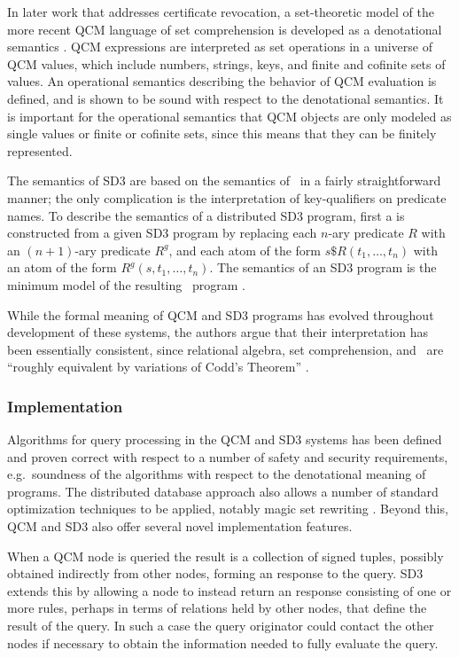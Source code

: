 In later work that addresses certificate revocation, a set-theoretic
model of the more recent QCM language of set comprehension is
developed as a denotational semantics \cite{Gunter:GCR}.  QCM
expressions are interpreted as set operations in a universe of QCM
values, which include numbers, strings, keys, and finite and cofinite
sets of values.  An operational semantics describing the behavior of
QCM evaluation is defined, and is shown to be sound with respect to
the denotational semantics.  It is important for the operational
semantics that QCM objects are only modeled as single values or finite
or cofinite sets, since this means that they can be finitely
represented.

The semantics of SD3 are based on the semantics of \datalog\ in a
fairly straightforward manner; the only complication is the
interpretation of key-qualifiers on predicate names.  To describe the
semantics of a distributed SD3 program, first a  is constructed from a given SD3 program by
replacing each $n$-ary predicate $R$ with an $(n+1)$-ary predicate
$R^g$, and each atom of the form $s\$R(t_1, \ldots, t_n)$ with an atom
of the form $R^g(s, t_1, \ldots, t_n)$. The semantics of an SD3
program is the minimum model of the resulting \datalog\ program
\cite{Jim:DDQE}.

While the formal meaning of QCM and SD3 programs has evolved
throughout development of these systems, the authors argue that their
interpretation has been essentially consistent, since relational
algebra, set comprehension, and \datalog\ are ``roughly equivalent by
variations of Codd's Theorem'' \cite{Jim:STMSCE}.


\subsubsection{Implementation} Algorithms for query processing in 
the QCM and SD3 systems has been defined and proven correct
\cite{Gunter:GCR,Jim:STMSCE} with respect to a number of safety and
security requirements, e.g.~soundness of the algorithms with respect
to the denotational meaning of programs.  The distributed database
approach also allows a number of standard optimization techniques to
be applied, notably magic set rewriting \cite{Jim:DDQE}.  Beyond this,
QCM and SD3 also offer several novel implementation features.

When a QCM node is queried the result is a collection of signed
tuples, possibly obtained indirectly from other nodes, forming an
 response to the query. SD3 extends this by
allowing a node to instead return an  response
consisting of one or more rules, perhaps in terms of relations held by
other nodes, that define the result of the query. In such a case the query
originator could contact the other nodes if necessary to obtain the
information needed to fully evaluate the query.

